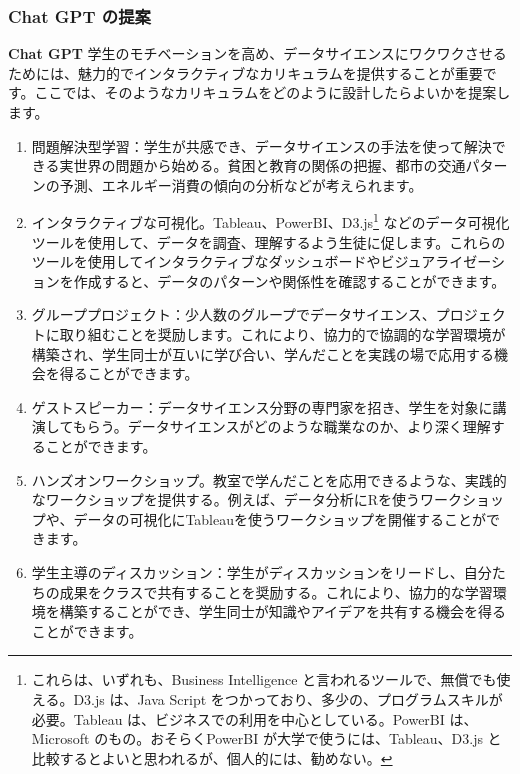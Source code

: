\documentclass[
]{bxjsbook}
\theoremstyle{definition}
\theoremstyle{definition}
\theoremstyle{definition}
\theoremstyle{definition}
\theoremstyle{remark}
\begin{document}
\hypertarget{chat-gpt-ux306eux63d0ux6848}{%
\subsubsection{Chat GPT の提案}\label{chat-gpt-ux306eux63d0ux6848}}

\textbf{Chat GPT} 学生のモチベーションを高め、データサイエンスにワクワクさせるためには、魅力的でインタラクティブなカリキュラムを提供することが重要です。ここでは、そのようなカリキュラムをどのように設計したらよいかを提案します。

\begin{enumerate}
\def\labelenumi{\arabic{enumi}.}
\item
  問題解決型学習：学生が共感でき、データサイエンスの手法を使って解決できる実世界の問題から始める。貧困と教育の関係の把握、都市の交通パターンの予測、エネルギー消費の傾向の分析などが考えられます。
\item
  インタラクティブな可視化。Tableau、PowerBI、D3.js\footnote{これらは、いずれも、Business Intelligence と言われるツールで、無償でも使える。D3.js は、Java Script をつかっており、多少の、プログラムスキルが必要。Tableau は、ビジネスでの利用を中心としている。PowerBI は、Microsoft のもの。おそらくPowerBI が大学で使うには、Tableau、D3.js と比較するとよいと思われるが、個人的には、勧めない。} などのデータ可視化ツールを使用して、データを調査、理解するよう生徒に促します。これらのツールを使用してインタラクティブなダッシュボードやビジュアライゼーションを作成すると、データのパターンや関係性を確認することができます。
\item
  グループプロジェクト：少人数のグループでデータサイエンス、プロジェクトに取り組むことを奨励します。これにより、協力的で協調的な学習環境が構築され、学生同士が互いに学び合い、学んだことを実践の場で応用する機会を得ることができます。
\item
  ゲストスピーカー：データサイエンス分野の専門家を招き、学生を対象に講演してもらう。データサイエンスがどのような職業なのか、より深く理解することができます。
\item
  ハンズオンワークショップ。教室で学んだことを応用できるような、実践的なワークショップを提供する。例えば、データ分析にRを使うワークショップや、データの可視化にTableauを使うワークショップを開催することができます。
\item
  学生主導のディスカッション：学生がディスカッションをリードし、自分たちの成果をクラスで共有することを奨励する。これにより、協力的な学習環境を構築することができ、学生同士が知識やアイデアを共有する機会を得ることができます。
\end{enumerate}
\end{document}
